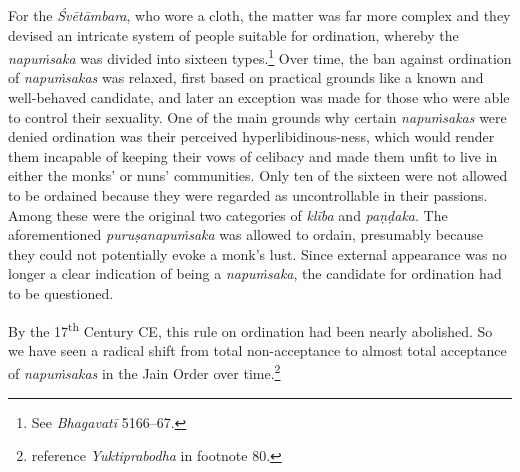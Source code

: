 For the {\em Śvētāmbara}, who wore a cloth, the matter was far more complex and they devised an intricate system of people suitable for ordination, whereby the {\em napuṁsaka} was divided into sixteen types.\footnote{See {\em Bhagavatī} 5166–67.} Over time, the ban against ordination of {\em napuṁsakas} was relaxed, first based on practical grounds like a known and well-behaved candidate, and later an exception was made for those who were able to control their sexuality. One of the main grounds why certain {\em napuṁsakas} were denied ordination was their perceived hyperlibidinous-ness, which would render them incapable of keeping their vows of celibacy and made them unfit to live in either the monks' or nuns' communities. Only ten of the sixteen were not allowed to be ordained because they were regarded as uncontrollable in their passions. Among these were the original two categories of {\em klība} and {\em paṇḍaka}. The aforementioned {\em puruṣanapuṁsaka} was allowed to ordain, presumably because they could not potentially evoke a monk's lust. Since external appearance was no longer a clear indication of being a {\em napuṁsaka}, the candidate for ordination had to be questioned. 

By the 17\textsuperscript{th} Century CE, this rule on ordination had been nearly abolished. So we have seen a radical shift from total non-acceptance to almost total acceptance of {\em napuṁsakas} in the Jain Order over time.\footnote{\cite{zwilling} reference {\em Yuktiprabodha} in footnote 80.}
